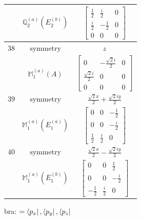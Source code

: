 \documentclass[fleqn,8pt,landscape]{jsarticle}
\begin{document}
\begin{longtable}{ccc}
$  $ & $ \mathbb{Q}_{2}^{(a)}(E_{2}^{(b)}) $ & $ \begin{bmatrix} \frac{1}{2} & \frac{i}{2} & 0 \\ \frac{i}{2} & - \frac{1}{2} & 0 \\ 0 & 0 & 0 \end{bmatrix} $ \\ \hline
$ 38 $ & $ \text{symmetry} $ & $ z $ \\
$  $ & $ \mathbb{M}_{1}^{(a)}(A) $ & $ \begin{bmatrix} 0 & - \frac{\sqrt{2} i}{2} & 0 \\ \frac{\sqrt{2} i}{2} & 0 & 0 \\ 0 & 0 & 0 \end{bmatrix} $ \\ \hline
$ 39 $ & $ \text{symmetry} $ & $ \frac{\sqrt{2} x}{2} + \frac{\sqrt{2} i y}{2} $ \\
$  $ & $ \mathbb{M}_{1}^{(a)}(E_{1}^{(a)}) $ & $ \begin{bmatrix} 0 & 0 & - \frac{1}{2} \\ 0 & 0 & - \frac{i}{2} \\ \frac{1}{2} & \frac{i}{2} & 0 \end{bmatrix} $ \\ \hline
$ 40 $ & $ \text{symmetry} $ & $ \frac{\sqrt{2} x}{2} - \frac{\sqrt{2} i y}{2} $ \\
$  $ & $ \mathbb{M}_{1}^{(a)}(E_{1}^{(b)}) $ & $ \begin{bmatrix} 0 & 0 & \frac{1}{2} \\ 0 & 0 & - \frac{i}{2} \\ - \frac{1}{2} & \frac{i}{2} & 0 \end{bmatrix} $ \\ \hline
\end{longtable}
bra: $=\bra{p_{x}}, \bra{p_{y}}, \bra{p_{z}}$
\end{document}
